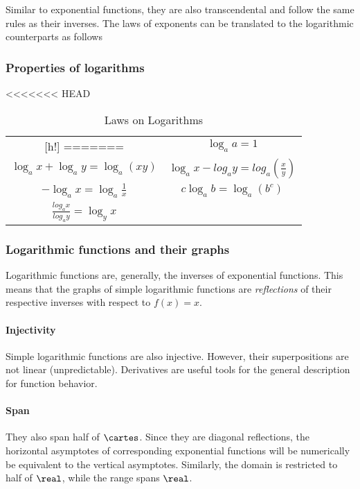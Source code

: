 Similar to exponential functions, they are also transcendental and follow the same rules as their inverses.
The laws of exponents can be translated to the logarithmic counterparts as follows

\subsubsection{Properties of logarithms}

\begin{table}
  \centering
  \caption{Laws on Logarithms}

<<<<<<< HEAD
  \begin{tabular}{c|c}[h!]
=======
  \begin{tabular}{c|c}
>>>>>>> ab4795d43bbb1722011d97d446e02f4d5b35c2ce
    $\log_a 1 = 0 \forall\ a \neq 0$ & $\log_a a = 1$ \\
    $\log_a x + \log_a y = \log_a (xy)$ & $\log_a x - log_a y = log_a (\frac{x}{y})$ \\
    $-\log_a x = \log_a \frac{1}{x}$ & $c\log_a b = \log_a (b^c)$ \\
    $\frac{log_a x}{log_a y} = \log_y x$
  \end{tabular}

\end{table}

\subsubsection{Logarithmic functions and their graphs}

Logarithmic functions are, generally, the inverses of exponential functions.
This means that the graphs of simple logarithmic functions are \emph{reflections} of their respective inverses with respect to $f(x) = x$.

\paragraph{Injectivity} Simple logarithmic functions are also injective.
However, their superpositions are not linear (unpredictable).
Derivatives are useful tools for the general description for function behavior.

\paragraph{Span} They also span half of $\cartes$.
Since they are diagonal reflections, the horizontal asymptotes of corresponding exponential functions will be numerically be equivalent to the vertical asymptotes.
Similarly, the domain is restricted to half of $\real$, while the range spans $\real$.

